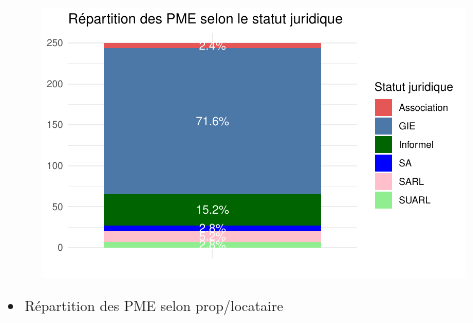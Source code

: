 \documentclass[
  letterpaper,
  DIV=11,
  numbers=noendperiod]{scrartcl}
\providecommand{\tightlist}{%
  \setlength{\itemsep}{0pt}\setlength{\parskip}{0pt}}\usepackage{longtable,booktabs,array}
\begin{document}
\begin{figure}[H]

{\centering \includegraphics{projet_R_files/figure-pdf/unnamed-chunk-22-1.pdf}

}

\end{figure}

\begin{itemize}
\tightlist
\item
  Répartition des PME selon prop/locataire
\end{itemize}
\end{document}
